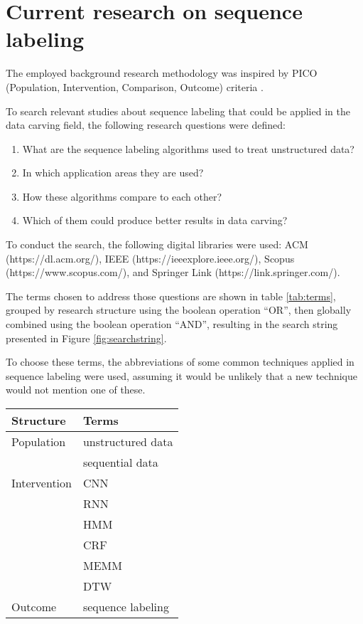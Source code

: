 \section{Current research on sequence labeling}
The employed background research methodology was inspired by PICO (Population, Intervention, Comparison, Outcome) criteria \cite{Kitchenham07guidelinesfor}.

To search relevant studies about sequence labeling that could be applied in the data carving field, the following research questions were defined:

\begin{enumerate}[itemindent=\parindent,label=\textbf{RQ\arabic*.}]
\item   What are the sequence labeling algorithms used to treat unstructured data?
\item   In which application areas they are used?
\item   How these algorithms compare to each other?
\item   Which of them could produce better results in data carving?
\end{enumerate}

To conduct the search, the following digital libraries were used: ACM (https://dl.acm.org/), 
IEEE (https://ieeexplore.ieee.org/),
Scopus (https://www.scopus.com/),
and
Springer Link (https://link.springer.com/).

The terms chosen to address those questions are shown in table \ref{tab:terms}, grouped by research structure using the boolean operation “OR”, then globally combined using the boolean operation “AND”, resulting in the search string presented in  Figure \ref{fig:searchstring}.

To choose these terms, the abbreviations of some common techniques applied in sequence labeling were used, assuming it would be unlikely that a new technique would not mention one of these.

\begin{table*}[!ht]
    \centering
    \begin{tabular}{ l  l  }
      Structure 	& Terms 		 \\
      \hline\hline
      Population 	& unstructured data \\   
                    & sequential data \\
      \hline
      Intervention 	& CNN \\
                    & RNN \\
                    & HMM \\
                    & CRF \\
                    & MEMM \\
                    & DTW \\
      \hline
      Outcome 		& sequence labeling \\
      \hline
    \end{tabular}
    \caption{Terms used}
    \label{tab:terms}
\end{table*}

